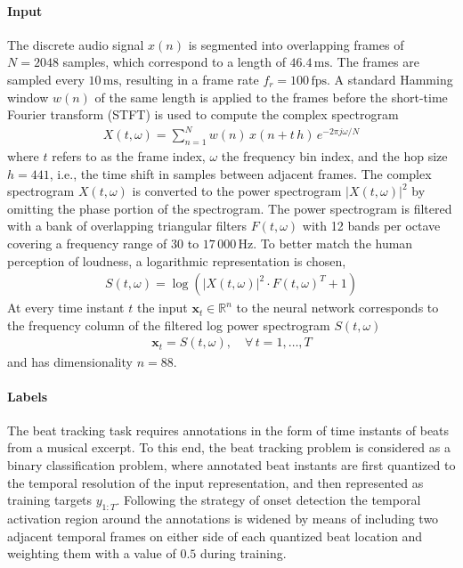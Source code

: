 \documentclass{scrartcl}
\begin{document}
\paragraph{Input}

The discrete audio signal $x(n)$ is segmented into overlapping frames of $N = 2048$ samples, which correspond to a length of $46.4 \,\text{ms}$. The frames are sampled every $10 \,\text{ms}$, resulting in a frame rate $f_r = 100 \,\text{fps}$. A standard Hamming window $w(n)$ of the same length is applied to the frames before the short-time Fourier transform (STFT) is used to compute the complex spectrogram 
\begin{align}
X(t,\omega) = \sum_{n = 1}^{N} w(n) \, x(n + t\,h) \, e^{-2 \pi j \omega /N}
\end{align} 
where $t$ refers to as the frame index, $\omega$ the frequency bin index, and the hop size $h=441$, i.e., the time shift in samples between adjacent frames. The complex spectrogram $X(t,\omega)$ is converted to the power spectrogram $|X(t,\omega)|^2$ by omitting the phase portion of the spectrogram. The power spectrogram is filtered with a bank of overlapping triangular filters $F(t,\omega)$ with 12 bands per octave covering a frequency range of $30$ to $17\,000 \, \text{Hz}$. To better match the human perception of loudness, a logarithmic representation is chosen, 
\begin{align}
S(t,\omega) = \log \left( |X(t,\omega)|^2 \cdot F(t,\omega)^T + 1 \right)
\end{align} 
At every time instant $t$ the input  $\mathbf x_t \in \mathbb R^n$ to the neural network corresponds to the frequency column of the filtered log power spectrogram $S(t,\omega)$
\begin{align}
\mathbf x_t = S(t,\omega), \quad \forall\, t= 1,\dots,T
\end{align} 
and has dimensionality $n=88$.


\paragraph{Labels}
The beat tracking task requires annotations in the form of time instants of beats from a musical excerpt. To this end, the beat tracking problem is considered as a binary classification problem, where annotated beat instants are first quantized to the temporal resolution of the input representation, and then represented as training targets $y_{1:T}$. Following the strategy of onset detection \cite{Schluter2014} the temporal activation region around the annotations is widened by means of including two adjacent temporal frames on either side of each quantized beat location and weighting them with a value of $0.5$ during training. 
\end{document}

